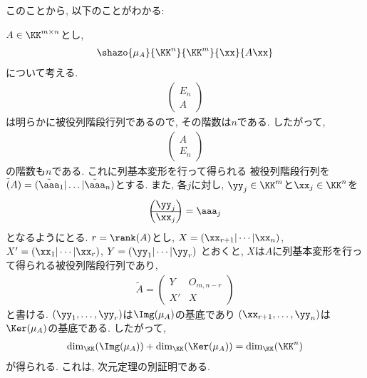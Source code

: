 このことから, 以下のことがわかる:
\begin{remark}
$A\in\KK^{m\times n}$とし,
\begin{align*}
  \shazo{\mu_A}{\KK^n}{\KK^m}
  {\xx}{A\xx}
\end{align*}
について考える.
\begin{align*}
\begin{pmatrix}E_n\\\hline A\end{pmatrix}
\end{align*}
は明らかに被役列階段行列であるので, その階数は$n$である.
したがって,
\begin{align*}
\begin{pmatrix}A\\\hline E_n\end{pmatrix}
\end{align*}
の階数も$n$である.
これに列基本変形を行って得られる
被役列階段行列を$\tilde(A)=(\tilde\aaa_1|\ldots|\tilde\aaa_n)$とする.
また, 各$j$に対し, $\yy_j\in\KK^m$と$\xx_j\in\KK^n$を
\begin{align*}
\begin{pmatrix}\yy_j\\\hline \xx_j\end{pmatrix}
 =\aaa_j
\end{align*}
となるようにとる.
$r=\rank(A)$とし,
  $X=(\xx_{r+1}|\cdots|\xx_{n})$,
  $X'=(\xx_{1}|\cdots|\xx_{r})$,
  $Y=(\yy_1|\cdots|\yy_r)$
とおくと,
$X$は$A$に列基本変形を行って得られる被役列階段行列であり,
\begin{align*}
  \tilde A =
  \left(
  \begin{array}{c|c}Y&O_{m,n-r}\\\hline X'&X\end{array}
    \right)
\end{align*}
と書ける.
$(\yy_1,\ldots,\yy_r)$は$\Img(\mu_A)$の基底であり
$(\xx_{r+1},\ldots,\yy_n)$は$\Ker(\mu_A)$の基底である.
したがって,
\begin{align*}
  \dim_\KK(\Img(\mu_A))+\dim_\KK(\Ker(\mu_A))=\dim_\KK(\KK^n)
\end{align*}
が得られる.
これは, 次元定理の別証明である.
\end{remark}

